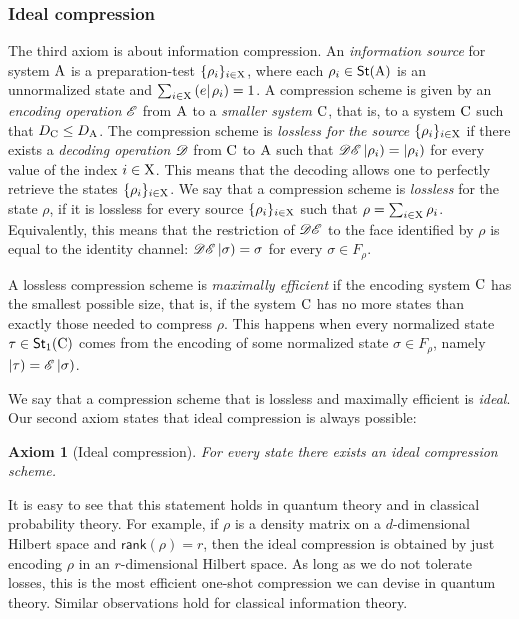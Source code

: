 \documentclass[12pt,aps,pra,showpacs,groupedaddress]{revtex4-1}
\newtheorem{axiom}{Axiom}\newtheorem{postulate}{Postulate}
\def\rC{{\rm C}}
\def\Stset{{\mathsf{St}}}
\def\K#1{\left|#1\right)}  \def\B#1{\left(#1\right|}
\def\SC#1#2{\left(#1\right|\left.\!#2\right)}  \def\Tr{{\rm Tr}}
\begin{document}
\subsubsection{Ideal compression}

The third axiom is about information compression.  An \emph{information source} for system ${\rm A}$ is
a preparation-test $\{\rho_i\}_{i \in {\rm X}}$, where each $\rho_i\in\Stset(\rA)$ is an unnormalized
state and $\sum_{i \in \rX} \SC e {\rho_i} =1$.  A compression scheme is given by an \emph{encoding
  operation} $\mathscr E $ from ${\rm A}$ to a \emph{smaller system} $\rC$, that is, to a system $\rC$ such
that $D_\rC \le D_\rA$.  The compression scheme is \emph{lossless for the source} $\{\rho_i\}_{i \in
  {\rm X}}$ if there exists a \emph{decoding operation} $\mathscr D$ from $\rC$ to ${\rm A}$ such that $\tD \tE
\K{\rho_i} = \K{\rho_i}$ for every value of the index $i \in {\rm X}$.  This means that the decoding
allows one to perfectly retrieve the states $\{\rho_i\}_{i \in{\rm X}}$.  We say that a compression
scheme is \emph{lossless} for the state $\rho$, if it is lossless for every source $\{\rho_i\}_{i
  \in {\rm X}}$ such that $\rho = \sum_{i \in {\rm X}} \rho_i$.  Equivalently, this means that the
restriction of $\mathscr D \mathscr E $ to the face identified by $\rho$ is equal to the identity channel: $\tD\tE
\K \sigma = \sigma$ for every $\sigma \in F_\rho$.

A lossless compression scheme is \emph{maximally efficient} if the encoding system $\rC$ has the
smallest possible size, that is, if the system $\rC$ has no more states than exactly those needed to
compress $\rho$. This happens when every normalized state $\tau \in\Stset_1 (\rC)$ comes from the
encoding of some normalized state $\sigma \in F_\rho$, namely $\K{\tau} = \tE \K{\sigma}$.
 
We say that a compression scheme that is lossless and maximally efficient is \emph{ideal}.  Our
second axiom states that ideal compression is always possible:
\begin{axiom}[Ideal compression]\label{compression}
For every state there exists an ideal compression scheme.  
\end{axiom}
It is easy to see that this statement holds in quantum theory and in classical probability theory.
For example, if  $\rho$ is a density matrix on a $d$-dimensional Hilbert space and
$\mathsf{rank}(\rho) =r$, then the ideal compression is obtained by just encoding $\rho$ in an
$r$-dimensional Hilbert space.  As long as we do not tolerate losses, this is the most efficient one-shot
compression we can devise in quantum theory.  Similar observations hold for classical
information theory.
\end{document}
